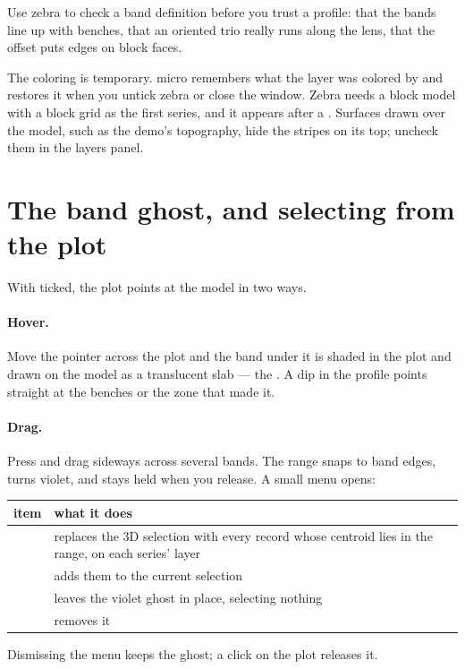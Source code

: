 Use zebra to check a band definition before you trust a profile: that the bands line up with benches, that an oriented trio really runs along the lens, that the offset puts edges on block faces.

The coloring is temporary. micro remembers what the layer was colored by and restores it when you untick zebra or close the window. Zebra needs a block model with a block grid as the first series, and it appears after a . Surfaces drawn over the model, such as the demo's topography, hide the stripes on its top; uncheck them in the layers panel.

\section{The band ghost, and selecting from the plot}\label{sec:swath-ghost}
With  ticked, the plot points at the model in two ways.

\paragraph{Hover.} Move the pointer across the plot and the band under it is shaded in the plot and drawn on the model as a translucent slab — the . A dip in the profile points straight at the benches or the zone that made it.

\paragraph{Drag.} Press and drag sideways across several bands. The range snaps to band edges, turns violet, and stays held when you release. A small menu opens:

\medskip
\begin{tabularx}{\linewidth}{@{}lL@{}}\toprule
item & what it does \\ \midrule
{} & replaces the 3D selection with every record whose centroid lies in the range, on each series' layer \\
 & adds them to the current selection \\
 & leaves the violet ghost in place, selecting nothing \\
 & removes it \\ \bottomrule
\end{tabularx}
\medskip

Dismissing the menu keeps the ghost; a click on the plot releases it.

